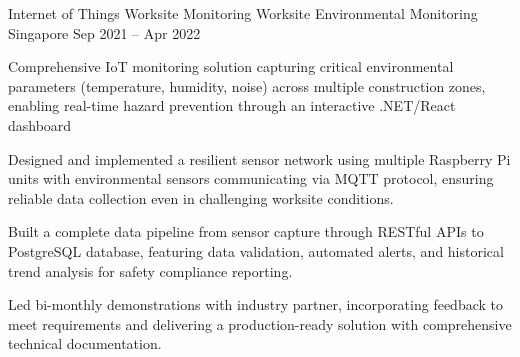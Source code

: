 \begin{cventries}
    \cventry
    {Internet of Things Worksite Monitoring} %
    {Worksite Environmental Monitoring} %
    {Singapore} %
    {Sep 2021 – Apr 2022} %
    {
        \begin{cvitems} %
            \item {Comprehensive IoT monitoring solution capturing critical environmental parameters (temperature, humidity, noise) across multiple construction zones, enabling real-time hazard prevention through an interactive .NET/React dashboard}
            \item {Designed and implemented a resilient sensor network using multiple Raspberry Pi units with environmental sensors communicating via MQTT protocol, ensuring reliable data collection even in challenging worksite conditions.}
            \item {Built a complete data pipeline from sensor capture through RESTful APIs to PostgreSQL database, featuring data validation, automated alerts, and historical trend analysis for safety compliance reporting.}
            \item {Led bi-monthly demonstrations with industry partner, incorporating feedback to meet requirements and delivering a production-ready solution with comprehensive technical documentation.}
            \vspace{3mm}
        \end{cvitems}
    }

\end{cventries}
